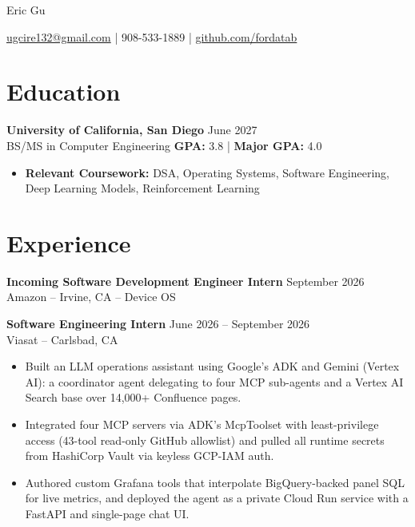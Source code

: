 \documentclass[10pt]{article}
\begin{document}
\centerline{\Huge Eric Gu}
\vspace{2pt}
\centerline{\href{mailto:ugcire132@gmail.com}{ugcire132@gmail.com} | 908-533-1889 | \href{https://github.com/fordatab}{github.com/fordatab}}
\vspace{-10pt}

\section*{Education}
\textbf{University of California, San Diego} \hfill June 2027 \\
BS/MS in Computer Engineering \hfill \textbf{GPA:} 3.8 | \textbf{Major GPA:} 4.0
\vspace{2pt}
\begin{itemize}[leftmargin=*, nosep]
    \item \textbf{Relevant Coursework:} DSA, Operating Systems, Software Engineering, Deep Learning Models, Reinforcement Learning
\end{itemize}
\vspace{-16pt}

\section*{Experience}
\textbf{Incoming Software Development Engineer Intern} \hfill September 2026 \\
Amazon -- Irvine, CA -- Device OS

\vspace{2pt}

\textbf{Software Engineering Intern} \hfill June 2026 -- September 2026 \\
Viasat -- Carlsbad, CA
\vspace{-2pt}
\begin{itemize}
    \item Built an LLM operations assistant using Google's ADK and Gemini (Vertex AI): a coordinator agent delegating to four MCP sub-agents and a Vertex AI Search base over 14,000+ Confluence pages.
    \item Integrated four MCP servers via ADK's McpToolset with least-privilege access (43-tool read-only GitHub allowlist) and pulled all runtime secrets from HashiCorp Vault via keyless GCP-IAM auth.
    \item Authored custom Grafana tools that interpolate BigQuery-backed panel SQL for live metrics, and deployed the agent as a private Cloud Run service with a FastAPI and single-page chat UI.
\end{itemize}
\vspace{2pt}
\end{document}
